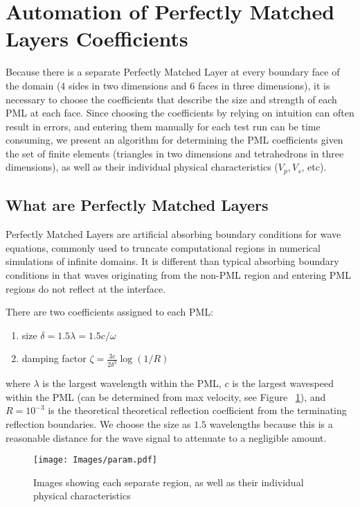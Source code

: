 \newpage
\section{Automation of Perfectly Matched Layers Coefficients}

Because there is a separate Perfectly Matched Layer at every boundary face of the domain (4 sides in two dimensions and 6 faces in three dimensions), it is necessary to choose the coefficients that describe the size and strength of each PML at each face. Since choosing the coefficients by relying on intuition can often result in errors, and entering them manually for each test run can be time consuming, we present an algorithm for determining the PML coefficients given the set of finite elements (triangles in two dimensions and tetrahedrons in three dimensions), as well as their individual physical characteristics ($V_p, V_s$, etc).

\subsection{What are Perfectly Matched Layers}

Perfectly Matched Layers are artificial absorbing boundary conditions for wave equations, commonly used to truncate computational regions in numerical simulations of infinite domains. It is different than typical absorbing boundary conditions in that waves originating from the non-PML region and entering PML regions do not reflect at the interface.

There are two coefficients assigned to each PML:
\begin{enumerate}
\item size $\delta = 1.5 \lambda = 1.5 c / \omega$
\item damping factor $\zeta = \frac{3c}{2\delta^3} \log(1/R)$
\end{enumerate}
where $\lambda$ is the largest wavelength within the PML, $c$ is the largest wavespeed within the PML (can be determined from max velocity, see Figure ~\ref{fig:physical-characteristics}), and $R = 10^{-3}$ is the theoretical theoretical reflection coefficient from the terminating reflection boundaries. We choose the size as $1.5$ wavelengths because this is a reasonable distance for the wave signal to attenuate to a negligible amount.

\begin{figure}[ht]
\texttt{[image: Images/param.pdf]}
\caption{Images showing each separate region, as well as their individual physical characteristics}
\label{fig:physical-characteristics}
\end{figure}

